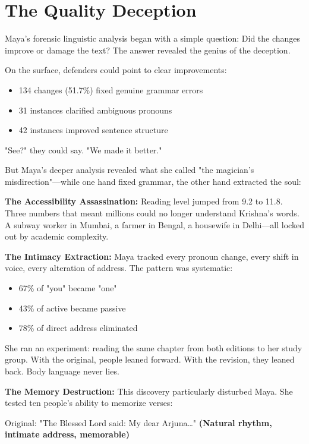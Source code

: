 \documentclass[11pt,twoside]{book}
\begin{document}
\section*{The Quality Deception}
\label{sec:org5fd66e9}

Maya's forensic linguistic analysis began with a simple question: Did the changes improve or damage the text? The answer revealed the genius of the deception.

On the surface, defenders could point to clear improvements:
\begin{itemize}
\item 134 changes (51.7\%) fixed genuine grammar errors
\item 31 instances clarified ambiguous pronouns
\item 42 instances improved sentence structure
\end{itemize}

"See?" they could say. "We made it better."

But Maya's deeper analysis revealed what she called "the magician's misdirection"—while one hand fixed grammar, the other hand extracted the soul:

\textbf{\textbf{The Accessibility Assassination:}}
Reading level jumped from 9.2 to 11.8. Three numbers that meant millions could no longer understand Krishna's words. A subway worker in Mumbai, a farmer in Bengal, a housewife in Delhi—all locked out by academic complexity.

\textbf{\textbf{The Intimacy Extraction:}}
Maya tracked every pronoun change, every shift in voice, every alteration of address. The pattern was systematic:
\begin{itemize}
\item 67\% of "you" became "one"
\item 43\% of active became passive
\item 78\% of direct address eliminated
\end{itemize}

She ran an experiment: reading the same chapter from both editions to her study group. With the original, people leaned forward. With the revision, they leaned back. Body language never lies.

\textbf{\textbf{The Memory Destruction:}}
This discovery particularly disturbed Maya. She tested ten people's ability to memorize verses:

Original: "The Blessed Lord said: My dear Arjuna\ldots{}"
\textbf{(Natural rhythm, intimate address, memorable)}
\end{document}

